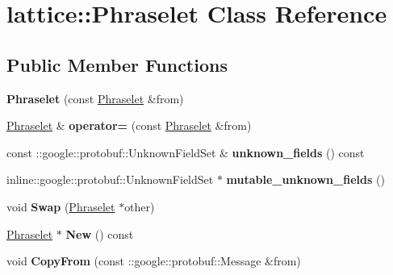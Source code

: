 \hypertarget{classlattice_1_1Phraselet}{
\section{lattice::Phraselet Class Reference}
\label{classlattice_1_1Phraselet}
}
\subsection*{Public Member Functions}
\begin{DoxyCompactItemize}
\item 
\hypertarget{classlattice_1_1Phraselet_aad52fffee57cf2c3c738db3911eb4bb9}{
{\bfseries Phraselet} (const \hyperlink{classlattice_1_1Phraselet}{Phraselet} \&from)}
\label{classlattice_1_1Phraselet_aad52fffee57cf2c3c738db3911eb4bb9}

\item 
\hypertarget{classlattice_1_1Phraselet_a351df01d2ffbf4f31cac03ee8c1fc237}{
\hyperlink{classlattice_1_1Phraselet}{Phraselet} \& {\bfseries operator=} (const \hyperlink{classlattice_1_1Phraselet}{Phraselet} \&from)}
\label{classlattice_1_1Phraselet_a351df01d2ffbf4f31cac03ee8c1fc237}

\item 
\hypertarget{classlattice_1_1Phraselet_ad493e6fbf47ab949e24f807b94232c64}{
const ::google::protobuf::UnknownFieldSet \& {\bfseries unknown\_\-fields} () const }
\label{classlattice_1_1Phraselet_ad493e6fbf47ab949e24f807b94232c64}

\item 
\hypertarget{classlattice_1_1Phraselet_a92f57adf0baa33f5152ee431b1aea6e1}{
inline::google::protobuf::UnknownFieldSet $\ast$ {\bfseries mutable\_\-unknown\_\-fields} ()}
\label{classlattice_1_1Phraselet_a92f57adf0baa33f5152ee431b1aea6e1}

\item 
\hypertarget{classlattice_1_1Phraselet_a475dcd429c962649f7f26e9cbd8d5a34}{
void {\bfseries Swap} (\hyperlink{classlattice_1_1Phraselet}{Phraselet} $\ast$other)}
\label{classlattice_1_1Phraselet_a475dcd429c962649f7f26e9cbd8d5a34}

\item 
\hypertarget{classlattice_1_1Phraselet_a6e0f65c2f64009750641683f3320d739}{
\hyperlink{classlattice_1_1Phraselet}{Phraselet} $\ast$ {\bfseries New} () const }
\label{classlattice_1_1Phraselet_a6e0f65c2f64009750641683f3320d739}

\item 
\hypertarget{classlattice_1_1Phraselet_a2d367abbea6d71d9ffaf3457661b5a42}{
void {\bfseries CopyFrom} (const ::google::protobuf::Message \&from)}
\label{classlattice_1_1Phraselet_a2d367abbea6d71d9ffaf3457661b5a42}


\end{DoxyCompactItemize}
